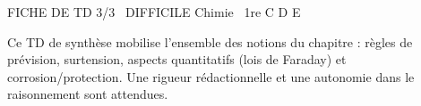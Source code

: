 \documentclass[11pt]{article}
\begin{document}
\begin{tcolorbox}[enhanced,colback=popink,colframe=popink,arc=10pt,boxrule=0pt,left=12pt,right=12pt,top=9pt,bottom=9pt]
{\color{white}\popxbold\small FICHE DE TD 3/3 \textbullet\ DIFFICILE \hfill Chimie \textbullet\ 1re C D E\par}
\end{tcolorbox}
\vspace{4pt}
Ce TD de synthèse mobilise l'ensemble des notions du chapitre : règles de prévision, surtension, aspects quantitatifs (lois de Faraday) et corrosion/protection. Une rigueur rédactionnelle et une autonomie dans le raisonnement sont attendues.
\end{document}
